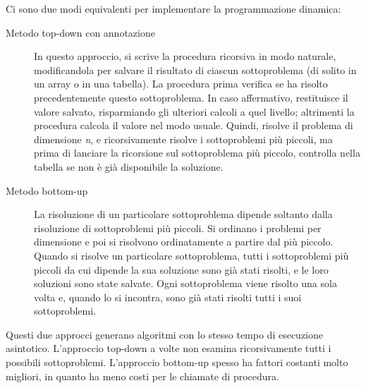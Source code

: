 \documentclass[10pt, a4paper]{report}
\begin{document}
Ci sono due modi equivalenti per implementare la programmazione dinamica:
\begin{description}
\item[Metodo top-down con annotazione]In questo approccio, si scrive la procedura ricorsiva in modo naturale, modificandola per salvare il risultato di ciascun sottoproblema (di solito in un array o in una tabella). La procedura prima verifica se ha risolto precedentemente questo sottoproblema. In caso affermativo, restituisce il valore salvato, risparmiando gli ulteriori calcoli a quel livello; altrimenti la procedura calcola il valore nel modo usuale. Quindi, risolve il problema di dimensione \textit{n}, e ricorsivamente risolve i sottoproblemi più piccoli, ma prima di lanciare la ricorsione sul sottoproblema più piccolo, controlla nella tabella se non è già disponibile la soluzione.
\item[Metodo bottom-up]La risoluzione di un particolare sottoproblema dipende soltanto dalla risoluzione di sottoproblemi più piccoli. Si ordinano i problemi per dimensione e poi si risolvono ordinatamente a partire dal più piccolo. Quando si risolve un particolare sottoproblema, tutti i sottoproblemi più piccoli da cui dipende la sua soluzione sono già stati risolti, e le loro soluzioni sono state salvate. Ogni sottoproblema viene risolto una sola volta e, quando lo si incontra, sono già stati risolti tutti i suoi sottoproblemi.
\end{description}
Questi due approcci generano algoritmi con lo stesso tempo di esecuzione asintotico. L'approccio top-down a volte non esamina ricorsivamente tutti i possibili sottoproblemi. L'approccio bottom-up spesso ha fattori costanti molto migliori, in quanto ha meno costi per le chiamate di procedura.\\
\end{document}
